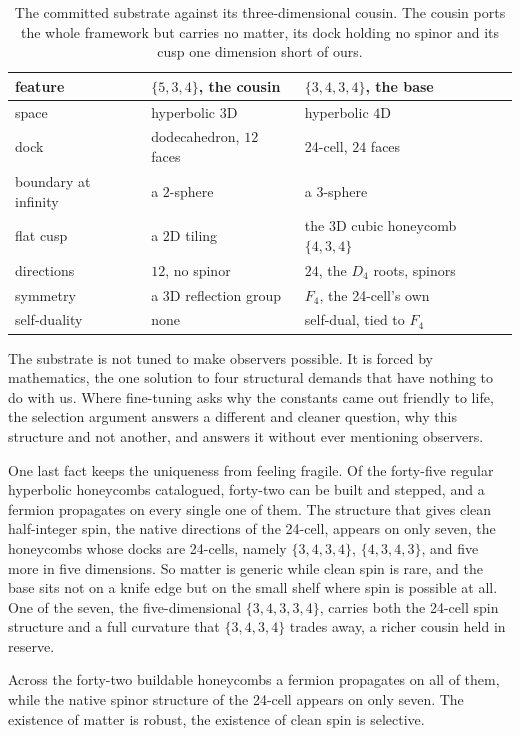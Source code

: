 \begin{table}[ht]
\centering
\begin{tabular}{@{}lll@{}}
\toprule
feature & $\{5,3,4\}$, the cousin & $\{3,4,3,4\}$, the base \\
\midrule
space & hyperbolic $3$D & hyperbolic $4$D \\
dock & dodecahedron, $12$ faces & 24-cell, $24$ faces \\
boundary at infinity & a $2$-sphere & a $3$-sphere \\
flat cusp & a $2$D tiling & the $3$D cubic honeycomb $\{4,3,4\}$ \\
directions & $12$, no spinor & $24$, the $D_4$ roots, spinors \\
symmetry & a $3$D reflection group & $F_4$, the 24-cell's own \\
self-duality & none & self-dual, tied to $F_4$ \\
\bottomrule
\end{tabular}
\caption{The committed substrate against its three-dimensional cousin. The cousin ports the whole framework but carries no matter, its dock holding no spinor and its cusp one dimension short of ours.}
\label{tab:compare}
\end{table}

The substrate is not tuned to make observers possible. It is forced by mathematics, the one solution to four structural demands that have nothing to do with us. Where fine-tuning asks why the constants came out friendly to life, the selection argument answers a different and cleaner question, why this structure and not another, and answers it without ever mentioning observers.

One last fact keeps the uniqueness from feeling fragile. Of the forty-five regular hyperbolic honeycombs catalogued, forty-two can be built and stepped, and a fermion propagates on every single one of them. The structure that gives clean half-integer spin, the native directions of the 24-cell, appears on only seven, the honeycombs whose docks are 24-cells, namely $\{3,4,3,4\}$, $\{4,3,4,3\}$, and five more in five dimensions. So matter is generic while clean spin is rare, and the base sits not on a knife edge but on the small shelf where spin is possible at all. One of the seven, the five-dimensional $\{3,4,3,3,4\}$, carries both the 24-cell spin structure and a full curvature that $\{3,4,3,4\}$ trades away, a richer cousin held in reserve.

\begin{result}
Across the forty-two buildable honeycombs a fermion propagates on all of them, while the native spinor structure of the 24-cell appears on only seven. The existence of matter is robust, the existence of clean spin is selective. \cite{pollard2026vibetest}
\end{result}
